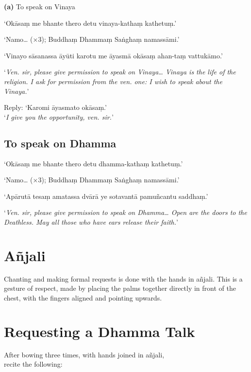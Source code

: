 \textbf{(a)} To speak on Vinaya


‘Okāsaṃ me bhante thero detu vinaya-kathaṃ kathetuṃ.’

‘Namo… (×3); Buddhaṃ Dhammaṃ Saṅghaṃ namassāmi.’

‘Vinayo sāsanassa āyūti karotu me āyasmā okāsaṃ ahan-taṃ vattukāmo.’

‘\emph{Ven. sir, please give permission to speak on Vinaya… Vinaya is the life
  of the religion. I ask for permission from the ven. one: I wish to speak about
  the Vinaya.}’

Reply: ‘Karomi āyasmato okāsaṃ.’\\
‘\emph{I give you the opportunity, ven. sir.}’ 

\subsection{To speak on Dhamma}


‘Okāsaṃ me bhante thero detu dhamma-kathaṃ kathetuṃ.’

‘Namo… (×3); Buddhaṃ Dhammaṃ Saṅghaṃ namassāmi.’

‘Apārutā tesaṃ amatassa dvārā ye sotavantā pamuñcantu saddhaṃ.’

‘\emph{Ven. sir, please give permission to speak on Dhamma… Open are the doors
  to the Deathless. May all those who have ears release their faith.}’

\section{Añjali}

Chanting and making formal requests is done with the hands in añjali.
This is a gesture of respect, made by placing the palms together
directly in front of the chest, with the fingers aligned and pointing
upwards.

\section{Requesting a Dhamma Talk}

\begin{instruction}
  After bowing three times, with hands joined in añjali,\\
  recite the following:
\end{instruction}

